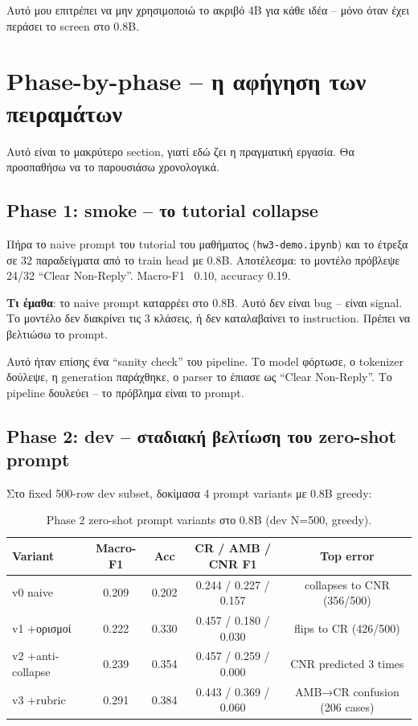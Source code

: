 \documentclass[12pt]{fphw}
\begin{document}
Αυτό μου επιτρέπει να μην χρησιμοποιώ το ακριβό 4B για κάθε ιδέα -- μόνο όταν έχει περάσει το screen στο 0.8B.

\section{Phase-by-phase -- η αφήγηση των πειραμάτων}

Αυτό είναι το μακρύτερο section, γιατί εδώ ζει η πραγματική εργασία. Θα προσπαθήσω να το παρουσιάσω χρονολογικά.

\subsection{Phase 1: smoke -- το tutorial collapse}

Πήρα το naive prompt του tutorial του μαθήματος (\texttt{hw3-demo.ipynb}) και το έτρεξα σε 32 παραδείγματα από το train head με 0.8B. Αποτέλεσμα: το μοντέλο πρόβλεψε 24/32 ``Clear Non-Reply''. Macro-F1 ~0.10, accuracy 0.19.

\textbf{Τι έμαθα}: το naive prompt καταρρέει στο 0.8B. Αυτό δεν είναι bug -- είναι signal. Το μοντέλο δεν διακρίνει τις 3 κλάσεις, ή δεν καταλαβαίνει το instruction. Πρέπει να βελτιώσω το prompt.

Αυτό ήταν επίσης ένα ``sanity check'' του pipeline. Το model φόρτωσε, ο tokenizer δούλεψε, η generation παράχθηκε, ο parser το έπιασε ως ``Clear Non-Reply''. Το pipeline δουλεύει -- το πρόβλημα είναι το prompt.

\subsection{Phase 2: dev -- σταδιακή βελτίωση του zero-shot prompt}

Στο fixed 500-row dev subset, δοκίμασα 4 prompt variants με 0.8B greedy:

\begin{table}[H]
\centering
\begin{tabular}{lcccc}
\toprule
Variant & Macro-F1 & Acc & CR / AMB / CNR F1 & Top error \\
\midrule
v0 naive & 0.209 & 0.202 & 0.244 / 0.227 / 0.157 & collapses to CNR (356/500) \\
v1 +ορισμοί & 0.222 & 0.330 & 0.457 / 0.180 / 0.030 & flips to CR (426/500) \\
v2 +anti-collapse & 0.239 & 0.354 & 0.457 / 0.259 / 0.000 & CNR predicted 3 times \\
v3 +rubric & 0.291 & 0.384 & 0.443 / 0.369 / 0.060 & AMB→CR confusion (206 cases) \\
\bottomrule
\end{tabular}
\caption{Phase 2 zero-shot prompt variants στο 0.8B (dev N=500, greedy).}
\end{table}
\end{document}
